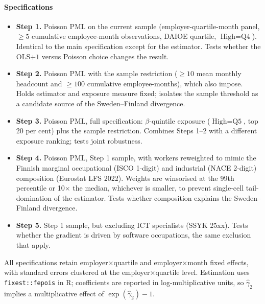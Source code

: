 \documentclass[preprint,12pt,authoryear]{elsarticle}
\begin{document}
\paragraph{Specifications}
\begin{itemize}
\itemsep0pt
\item \textbf{Step 1.} Poisson PML on the current sample (employer-quartile-month panel, $\geq 5$ cumulative employee-month observations, DAIOE quartile, $\text{High} = \text{Q4}$). Identical to the main specification except for the estimator. Tests whether the OLS$+1$ versus Poisson choice changes the result.
\item \textbf{Step 2.} Poisson PML with the \citet{brynjolfsson2025canaries} sample restriction ($\geq 10$ mean monthly headcount and $\geq 100$ cumulative employee-months), which \citet{kauhanen2026youth} also impose. Holds estimator and exposure measure fixed; isolates the sample threshold as a candidate source of the Sweden--Finland divergence.
\item \textbf{Step 3.} Poisson PML, full \citet{kauhanen2026youth} specification: \citet{eloundou2024gpts} $\beta$-quintile exposure ($\text{High} = \text{Q5}$, top 20 per cent) plus the \citet{brynjolfsson2025canaries} sample restriction. Combines Steps 1--2 with a different exposure ranking; tests joint robustness.
\item \textbf{Step 4.} Poisson PML, Step 1 sample, with workers reweighted to mimic the Finnish marginal occupational (ISCO 1-digit) and industrial (NACE 2-digit) composition (Eurostat LFS 2022). Weights are winsorised at the 99th percentile or 10$\times$ the median, whichever is smaller, to prevent single-cell tail-domination of the estimator. Tests whether composition explains the Sweden--Finland divergence.
\item \textbf{Step 5.} Step 1 sample, but excluding ICT specialists (SSYK 25xx). Tests whether the gradient is driven by software occupations, the same exclusion that \citet{brynjolfsson2025canaries} apply.
\end{itemize}
All specifications retain employer$\times$quartile and employer$\times$month fixed effects, with standard errors clustered at the employer$\times$quartile level. Estimation uses \texttt{fixest::fepois} in R; coefficients are reported in log-multiplicative units, so $\hat\gamma_2$ implies a multiplicative effect of $\exp(\hat\gamma_2)-1$.
\end{document}
